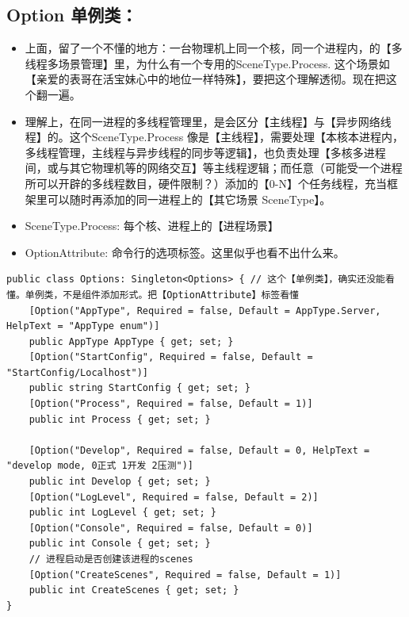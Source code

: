 \documentclass[9pt, b5paper]{article}
\begin{document}
\subsection{Option 单例类：}
\label{sec-3-6}
\begin{itemize}
\item 上面，留了一个不懂的地方：一台物理机上同一个核，同一个进程内，的【多线程多场景管理】里，为什么有一个专用的SceneType.Process. 这个场景如【亲爱的表哥在活宝妹心中的地位一样特殊】，要把这个理解透彻。现在把这个翻一遍。
\item 理解上，在同一进程的多线程管理里，是会区分【主线程】与【异步网络线程】的。这个SceneType.Process 像是【主线程】，需要处理【本核本进程内，多线程管理，主线程与异步线程的同步等逻辑】，也负责处理【多核多进程间，或与其它物理机等的网络交互】等主线程逻辑；而任意（可能受一个进程所可以开辟的多线程数目，硬件限制？）添加的【0-N】个任务线程，充当框架里可以随时再添加的同一进程上的【其它场景 SceneType】。
\item SceneType.Process: 每个核、进程上的【进程场景】
\item OptionAttribute: 命令行的选项标签。这里似乎也看不出什么来。
\end{itemize}
\begin{verbatim}
public class Options: Singleton<Options> { // 这个【单例类】，确实还没能看懂。单例类，不是组件添加形式。把【OptionAttribute】标签看懂
    [Option("AppType", Required = false, Default = AppType.Server, HelpText = "AppType enum")]
    public AppType AppType { get; set; }
    [Option("StartConfig", Required = false, Default = "StartConfig/Localhost")]
    public string StartConfig { get; set; }
    [Option("Process", Required = false, Default = 1)]
    public int Process { get; set; }

    [Option("Develop", Required = false, Default = 0, HelpText = "develop mode, 0正式 1开发 2压测")]
    public int Develop { get; set; }
    [Option("LogLevel", Required = false, Default = 2)]
    public int LogLevel { get; set; }
    [Option("Console", Required = false, Default = 0)]
    public int Console { get; set; }
    // 进程启动是否创建该进程的scenes
    [Option("CreateScenes", Required = false, Default = 1)]
    public int CreateScenes { get; set; }
}
\end{verbatim}
\end{document}
